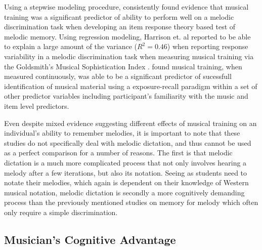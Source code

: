 \documentclass[12pt,]{book}
\begin{document}
Using a stepwise modeling procedure, \citet{harrisonModellingMelodicDiscrimination2016} consistently found evidence that musical training was a significant predictor of ability to perform well on a melodic discrimination task when developing an item response theory based test of melodic memory.
Using regression modeling, Harrison et. al reported to be able to explain a large amount of the variance (\(R^2 = 0.46\)) when reporting response variability in a melodic discrimination task \citep{harrisonApplyingModernPsychometric2017a} when measuring musical training via the Goldsmith's Musical Sophistication Index \citep{mullensiefenMusicalityNonMusiciansIndex2014}.
\citet{bakerPerceptionLeitmotivesRichard2017} found musical training, when measured continuously, was able to be a significant predictor of sucessfull identification of musical material using a exposure-recall paradigm within a set of other predictor variables including participant's familiarity with the music and item level predictors.

Even despite mixed evidence suggesting different effects of musical training on an individual's ability to remember melodies, it is important to note that these studies do not specifically deal with melodic dictation, and thus cannot be used as a perfect comparison for a number of reasons.
The first is that melodic dictation is a much more complicated process that not only involves hearing a melody after a few iterations, but also its notation.
Seeing as students need to notate their melodies, which again is dependent on their knowledge of Western musical notation, melodic dictation is secondly a more cognitively demanding process than the previously mentioned studies on memory for melody which often only require a simple discrimination.

\hypertarget{musicians-cognitive-advantage}{%
\subsection{Musician's Cognitive Advantage}\label{musicians-cognitive-advantage}}
\end{document}

